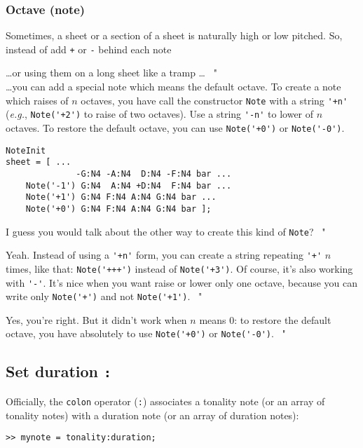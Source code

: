 \documentclass{article}
\newenvironment{meenv}{ \par \noindent \makebox[6em][r]{ \textcolor{mecolor}{Me}: " --~}}{~"}
\newenvironment{myselfenv}{ \par \noindent \makebox[6em][r]{ \textcolor{myselfcolor}{Myself}: " --~}}{~"}
\newcommand{ \me }[1]{%
\begin{meenv}%
	#1%
\end{meenv} }
\newcommand{ \myself }[1]{%
\begin{myselfenv}%
	#1%
\end{myselfenv} }
\begin{document}
\subsubsection{Octave (note)}
\label{sec:OctaveNote}

Sometimes, a sheet or a section of a sheet is naturally high or low pitched. So, instead of add \lstinline!+! or \lstinline!-! behind each note
\myself{\dots or using them on a long sheet like a tramp \dots} \\
\dots you can add a special note which means the default octave. To create a note which raises of $n$ octaves, you have call the constructor \lstinline!Note! with a string \lstinline!'+n'! (\emph{e.g.}, \lstinline!Note('+2')! to raise of two octaves). Use a string \lstinline!'-n'! to lower of $n$ octaves. To restore the default octave, you can use \lstinline!Note('+0')! or \lstinline!Note('-0')!. \\

\begin{lstlisting}
NoteInit
sheet = [ ...
	          -G:N4 -A:N4  D:N4 -F:N4 bar ...
	Note('-1') G:N4  A:N4 +D:N4  F:N4 bar ...
	Note('+1') G:N4 F:N4 A:N4 G:N4 bar ...
	Note('+0') G:N4 F:N4 A:N4 G:N4 bar ];
\end{lstlisting}

\myself{I guess you would talk about the other way to create this kind of \lstinline!Note!?}
\me{Yeah. Instead of using a \lstinline!'+n'! form, you can create a string repeating \lstinline!'+'! $n$ times, like that: \lstinline!Note('+++')! instead of \lstinline!Note('+3')!. Of course, it's also working with \lstinline!'-'!. It's nice when you want raise or lower only one octave, because you can write only \lstinline!Note('+')! and not \lstinline!Note('+1')!.}
\myself{Yes, you're right. But it didn't work when $n$ means $0$: to restore the default octave, you have absolutely to use \lstinline!Note('+0')! or \lstinline!Note('-0')!.}

\subsection{Set duration \lstinline!:!}
\label{sec:SetDuration}

Officially, the \lstinline!colon! operator (\lstinline!:!) associates a tonality note (or an array of tonality notes) with a duration note (or an array of duration notes):
\begin{lstlisting}
>> mynote = tonality:duration;
\end{lstlisting}
\end{document}
